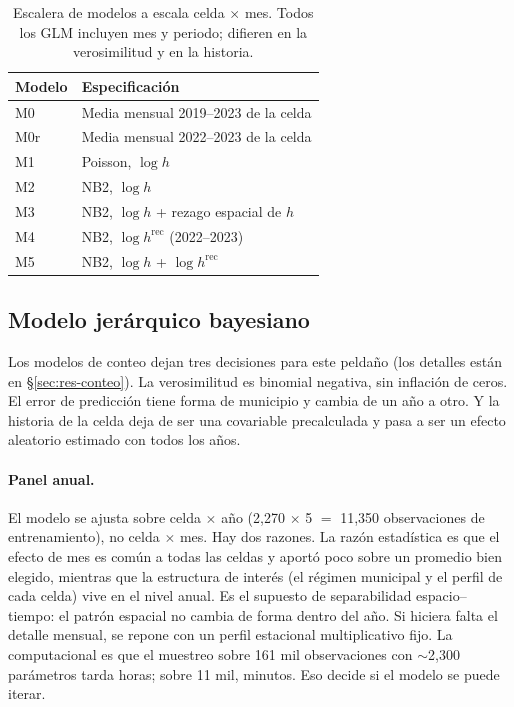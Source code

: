 \begin{table}[t]
	\centering\footnotesize
	\caption{Escalera de modelos a escala celda $\times$ mes. Todos los GLM
		incluyen mes y periodo; difieren en la verosimilitud y en la historia.}
	\label{tab:escalera}
	\begin{tabular}{@{}ll@{}}
		\toprule
		Modelo & Especificación                          \\
		\midrule
		M0     & Media mensual 2019--2023 de la celda    \\
		M0r    & Media mensual 2022--2023 de la celda    \\
		M1     & Poisson, $\log h$                       \\
		M2     & NB2, $\log h$                           \\
		M3     & NB2, $\log h$ + rezago espacial de $h$  \\
		M4     & NB2, $\log h^{\text{rec}}$ (2022--2023) \\
		M5     & NB2, $\log h$ + $\log h^{\text{rec}}$   \\
		\bottomrule
	\end{tabular}
\end{table}

\subsection{Modelo jerárquico bayesiano}\label{sec:met-jerarquico}

Los modelos de conteo dejan tres decisiones para este peldaño (los
detalles están en §\ref{sec:res-conteo}). La verosimilitud es binomial negativa, sin inflación de ceros. El error de predicción tiene forma de
municipio y cambia de un año a otro. Y la historia de la celda deja de ser
una covariable precalculada y pasa a ser un efecto aleatorio estimado con
todos los años.

\paragraph{Panel anual.} El modelo se ajusta sobre celda $\times$ año (2,270
$\times$ 5 $=$ 11,350 observaciones de entrenamiento), no celda $\times$ mes.
Hay dos razones. La razón estadística es que el efecto de mes es común a todas las
celdas y aportó poco sobre un promedio bien elegido, mientras que la
estructura de interés (el régimen municipal y el perfil de cada celda) vive
en el nivel anual. Es el supuesto de separabilidad espacio--tiempo: el patrón
espacial no cambia de forma dentro del año. Si hiciera falta el detalle
mensual, se repone con un perfil estacional multiplicativo fijo. La
computacional es que el muestreo sobre 161 mil observaciones con
$\sim$2,300 parámetros tarda horas; sobre 11 mil, minutos. Eso decide si el
modelo se puede iterar.

